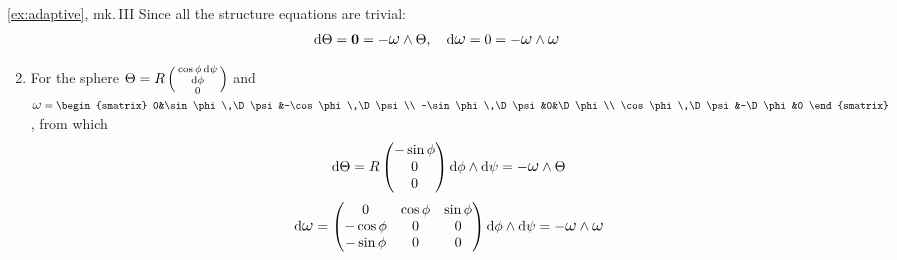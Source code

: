 \begin{examples*}{\ref{ex:adaptive}, mk.\,III}{}
\exstart Since  all the structure equations are trivial:
	\[\D\Theta=\V0=-\lomega\wedge\Theta,\quad \D\lomega=0=-\lomega\wedge\lomega\]
	
\begin{enumerate}\setcounter{enumi}{1}
  \item For the sphere $\Theta=R\left(\begin{smallmatrix}\cos\phi\,\mathrm{d}\psi\\\mathrm{d}\phi\\0\end{smallmatrix}\right)$ and  $\lomega=\begin{smatrix}
		0&\sin\phi\,\D\psi&-\cos\phi\,\D\psi\\
		-\sin\phi\,\D\psi&0&\D\phi\\
		\cos\phi\,\D\psi&-\D\phi&0
	\end{smatrix}$, from which
	\[\D\Theta=R\threevec{-\sin\phi}{0}{0}\D\phi\wedge\D\psi =-\lomega\wedge\Theta\]
	\[
	\D\lomega=\begin{pmatrix}
		0&\cos\phi&\sin\phi\\
		-\cos\phi&0&0\\
		-\sin\phi&0&0
	\end{pmatrix}
	\D\phi\wedge\D\psi =-\lomega\wedge\lomega
	\]
  

\end{enumerate}
\end{examples*}

